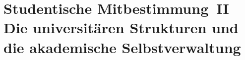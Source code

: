 \begin{multicols*}{2}


\end{multicols*}


\clearpage


\section*{Studentische Mitbestimmung~II\\Die universitären Strukturen und die akademische Selbstverwaltung}
